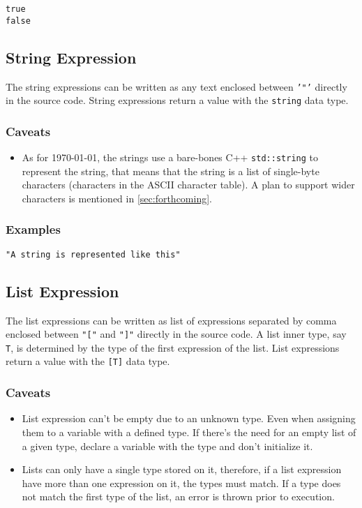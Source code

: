 \begin{lstlisting}
true
false
\end{lstlisting}

\subsection{String Expression}

The string expressions can be written as any text enclosed between \texttt{'"'} directly in the source code.
String expressions return a value with the \texttt{string} data type.

\subsubsection{Caveats}

\begin{itemize}
    \item As for \today, the strings use a bare-bones C++ \texttt{std::string} to represent the string, that means that the string
        is a list of single-byte characters (characters in the ASCII character table). A plan to support wider characters is mentioned
        in \autoref{sec:forthcoming}.
\end{itemize}

\subsubsection{Examples}

\begin{lstlisting}
"A string is represented like this"
\end{lstlisting}

\subsection{List Expression}

The list expressions can be written as list of expressions separated by comma enclosed between \texttt{"["} and \texttt{"]"}
directly in the source code. A list inner type, say \texttt{T}, is determined by the type of the first expression of the list.
List expressions return a value with the \texttt{[T]} data type.

\subsubsection{Caveats}

\begin{itemize}
    \item List expression can't be empty due to an unknown type. Even when assigning them to a variable with a defined type. If there's the
        need for an empty list of a given type, declare a variable with the type and don't initialize it.
    \item Lists can only have a single type stored on it, therefore, if a list expression have more than one expression on it, the types
        must match. If a type does not match the first type of the list, an error is thrown prior to execution.
\end{itemize}

